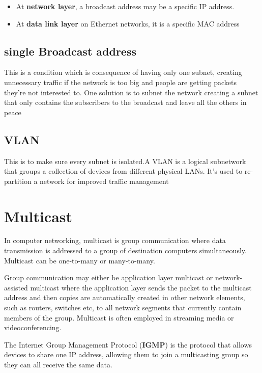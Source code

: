 \documentclass[a4paper,12pt]{book}
\begin{document}
\begin{itemize}
\item{At \textbf{network layer}, a broadcast address may be a specific IP address.}
\item{At \textbf{data link layer} on Ethernet networks, it is a specific MAC address}
\end{itemize}

\subsection{single Broadcast address}
This is a condition which is consequence of having only one subnet, creating unnecessary traffic if the network is too big and people are getting packets they're not interested to. One solution is to subnet the network creating a subnet that only contains the subscribers to the broadcast and leave all the others in peace


\subsection{VLAN}
This is to make sure every subnet is isolated.A VLAN is a logical subnetwork that groups a collection of devices from different physical LANs. It's used to re-partition a network for improved traffic management



\section{Multicast}
In computer networking, multicast is group communication where data transmission is addressed to a group of destination computers simultaneously. Multicast can be one-to-many or many-to-many.

Group communication may either be application layer multicast or network-assisted multicast where the application layer sends the packet to the multicast address and then copies are automatically created in other network elements, such as routers, switches etc, to all network segments that currently contain members of the group. 
Multicast is often employed in streaming media or videoconferencing.

The Internet Group Management Protocol (\textbf{IGMP}) is the protocol that allows devices to share one IP address, allowing them to join a multicasting group so they can all receive the same data. 
\end{document}
